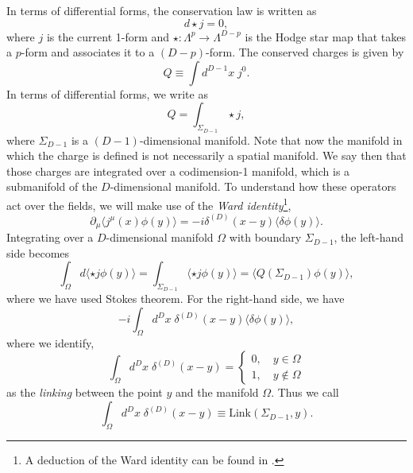 \documentclass{article}
\begin{document}
In terms of differential forms, the conservation law is written as
\begin{equation}
	d\star j=0,
\end{equation}
where $j$ is the current 1-form and $\star:\Lambda^p\to \Lambda^{D-p}$   is the Hodge star map that takes a $p$-form and associates it to a $(D-p)$-form. The conserved charges is given by
\begin{equation}
	Q\equiv\int d^{D-1}x\;j^0.
\end{equation}
In terms of differential forms, we write as
\begin{equation}
	Q=\int_{\Sigma_{D-1}}\star j,
\end{equation}
where $\Sigma_{D-1}$  is a $(D-1)$-dimensional manifold. Note that now the manifold in which the charge is defined is not necessarily a spatial manifold. We say then that those charges are integrated over a codimension-1 manifold, which is a submanifold of the $D$-dimensional manifold.  To understand how these operators act over the fields, we will make use of the \textit{Ward identity}\footnote{A deduction of the Ward identity can be found in \cite{schwartz_quantum_2014,gomes_introduction_2023}.},
\begin{equation}
	\partial_\mu\langle j^\mu(x)\phi(y)\rangle=-i\delta^{(D)}(x-y)\langle\delta\phi(y)\rangle.
\end{equation}
Integrating over a $D$-dimensional manifold $\Omega$  with boundary $\Sigma_{D-1}$, the left-hand side becomes
\begin{equation}
	\int_{\Omega}d\langle\star j\phi(y)\rangle=\int_{\Sigma_{D-1}}\langle\star j\phi(y)\rangle=\langle Q(\Sigma_{D-1})\phi(y)\rangle,
\end{equation}
where we have used Stokes theorem. For the right-hand side, we have
\begin{equation}
	-i\int_{\Omega}d^Dx\;\delta^{(D)}(x-y)\langle\delta\phi(y)\rangle,
\end{equation}
where we identify,
\begin{equation}
	\int_{\Omega}d^Dx\;\delta^{(D)}(x-y)=\begin{cases}0,\quad y\in\Omega\\1,\quad y\not\in\Omega\end{cases}
\end{equation}
as the \textit{linking} between the point $y$ and the manifold $\Omega$. Thus we call  
\begin{equation}
	\int_{\Omega}d^Dx\;\delta^{(D)}(x-y)\equiv \text{Link}(\Sigma_{D-1},y).
\end{equation}
\end{document}
